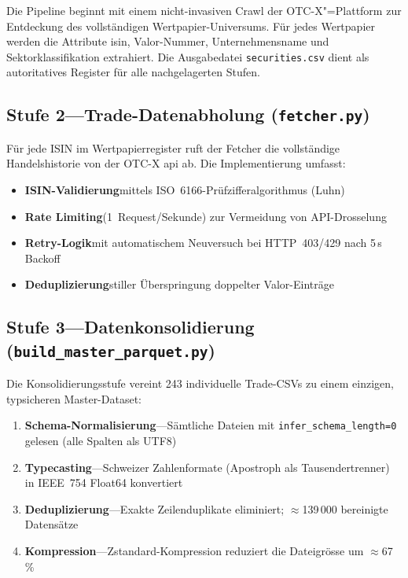 \documentclass[11pt, a4paper, oneside, openany]{report}
\newcommand{\code}[1]{\texttt{\small\textcolor{DeepNavy}{#1}}}
\begin{document}
Die Pipeline beginnt mit einem nicht-invasiven Crawl der OTC-X"=Plattform zur Entdeckung des vollständigen Wertpapier-Universums. Für jedes Wertpapier werden die Attribute \gls{isin}, Valor-Nummer, Unternehmensname und Sektorklassifikation extrahiert. Die Ausgabedatei \code{securities.csv} dient als autoritatives Register für alle nachgelagerten Stufen.

\subsection{Stufe 2\;---\;Trade-Datenabholung (\code{fetcher.py})}

Für jede ISIN im Wertpapierregister ruft der Fetcher die vollständige Handelshistorie von der OTC-X \gls{api} ab. Die Implementierung umfasst:

\begin{itemize}
  \item \textbf{ISIN-Validierung}\;mittels ISO~6166-Prüfzifferalgorithmus (Luhn)
  \item \textbf{Rate Limiting}\;(1~Request/Sekunde) zur Vermeidung von API-Drosselung
  \item \textbf{Retry-Logik}\;mit automatischem Neuversuch bei HTTP~403/429 nach 5\,s Backoff
  \item \textbf{Deduplizierung}\;stiller Überspringung doppelter Valor-Einträge
\end{itemize}

\subsection{Stufe 3\;---\;Datenkonsolidierung (\code{build\_master\_parquet.py})}

Die Konsolidierungsstufe vereint 243 individuelle Trade-CSVs zu einem einzigen, typsicheren Master-Dataset:

\begin{enumerate}
  \item \textbf{Schema-Normalisierung}\;---\;Sämtliche Dateien mit \code{infer\_schema\_length=0} gelesen (alle Spalten als UTF8)
  \item \textbf{Typecasting}\;---\;Schweizer Zahlenformate (Apostroph als Tausendertrenner) in IEEE~754 Float64 konvertiert
  \item \textbf{Deduplizierung}\;---\;Exakte Zeilenduplikate eliminiert; $\approx$139\,000 bereinigte Datensätze
  \item \textbf{Kompression}\;---\;Zstandard-Kompression reduziert die Dateigrösse um $\approx$67\,\%
\end{enumerate}
\end{document}
